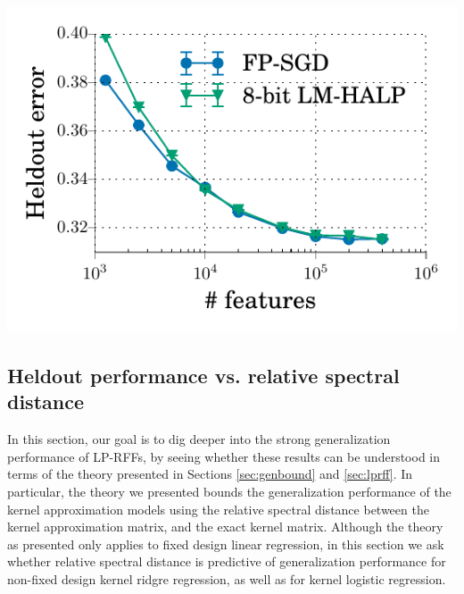 \begin{table}[ht]
\begin{minipage}{0.4\linewidth}
	\includegraphics[width=\linewidth]{figures/timit_error_vs_n_feat_lm_halp.pdf}
	\caption{Low-precision training on TIMIT using 8-bit LM-HALP on 8-bit LP-RFFs, relative to full-precision SGD.
	}	
	\label{fig:halp}
\end{minipage}
\end{table}


\subsection{Heldout performance vs. relative spectral distance}
In this section, our goal is to dig deeper into the strong generalization performance of LP-RFFs, by seeing whether these results can be understood in terms of the theory presented in Sections \ref{sec:genbound} and \ref{sec:lprff}.  In particular, the theory we presented bounds the generalization performance of the kernel approximation models using the relative spectral distance between the kernel approximation matrix, and the exact kernel matrix.  Although the theory as presented only applies to fixed design linear regression, in this section we ask whether relative spectral distance is predictive of generalization performance for non-fixed design kernel ridgre regression, as well as for kernel logistic regression.

